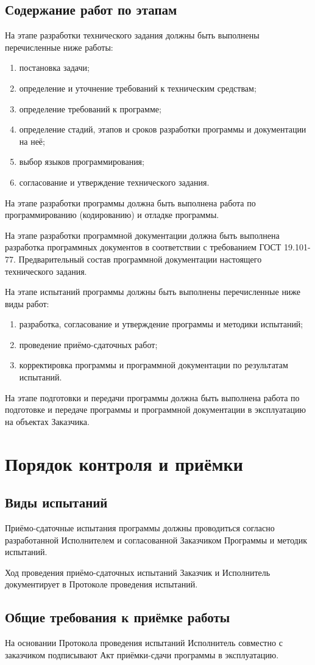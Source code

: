 \section{Содержание работ по этапам}
На этапе разработки технического задания должны быть выполнены перечисленные ниже работы:
\begin{enumerate}
    \item постановка задачи;
    \item определение и уточнение требований к техническим средствам;
    \item определение требований к программе;
    \item определение стадий, этапов и сроков разработки программы и документации на неё;
    \item выбор языков программирования;
    \item согласование и утверждение технического задания.
\end{enumerate}

На этапе разработки программы должна быть выполнена работа по программированию (кодированию) и отладке 
программы.

На этапе разработки программной документации должна быть выполнена разработка программных документов в 
соответствии с требованием ГОСТ 19.101-77. Предварительный состав программной документации настоящего 
технического задания.

На этапе испытаний программы должны быть выполнены перечисленные ниже виды работ:
\begin{enumerate}
    \item разработка, согласование и утверждение программы и методики испытаний;
    \item проведение приёмо-сдаточных работ;
    \item корректировка программы и программной документации по результатам испытаний.
\end{enumerate}

На этапе подготовки и передачи программы должна быть выполнена работа по подготовке и передаче программы и 
программной документации в эксплуатацию на объектах Заказчика.

\chapter{Порядок контроля и приёмки}
\section{Виды испытаний}
Приёмо-сдаточные испытания программы должны проводиться согласно разработанной Исполнителем и согласованной 
Заказчиком Программы и методик испытаний.

Ход проведения приёмо-сдаточных испытаний Заказчик и Исполнитель документирует в Протоколе проведения 
испытаний.

\section{Общие требования к приёмке работы}
На основании Протокола проведения испытаний Исполнитель совместно с заказчиком подписывают Акт приёмки-сдачи 
программы в эксплуатацию.